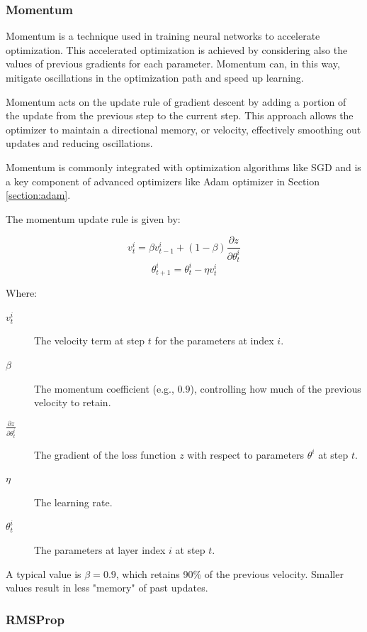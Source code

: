 		\bigskip
		\subsubsection{Momentum}
		\label{section:momentum}
		
		Momentum is a technique used in training neural networks to accelerate optimization. This accelerated optimization is achieved by considering also the values of previous gradients for each parameter. Momentum can, in this way, mitigate oscillations in the optimization path and speed up learning.
		
		Momentum acts on the update rule of gradient descent by adding a portion of the update from the previous step to the current step. This approach allows the optimizer to maintain a directional memory, or velocity, effectively smoothing out updates and reducing oscillations.
		
		Momentum is commonly integrated with optimization algorithms like SGD and is a key component of advanced optimizers like Adam optimizer in Section \ref{section:adam}.
		
		The momentum update rule is given by:
		
		$$
		v^i_t = \beta v^i_{t-1} + (1 - \beta)\frac{\partial z}{\partial \theta^i_{t}}
		$$
		$$
		\theta^i_{t+1} = \theta^i_t - \eta v^i_t
		$$
		
		Where:
		\begin{description}
			\item[$v^i_t$] The velocity term at step $t$ for the parameters at index $i$.
			\item[$\beta$] The momentum coefficient (e.g., $0.9$), controlling how much of the previous velocity to retain.
			\item[$\frac{\partial z}{\partial \theta^i_{t}}$] The gradient of the loss function $z$ with respect to parameters $\theta^i$ at step $t$.
			\item[$\eta$] The learning rate.
			\item[$\theta^i_t$] The parameters at layer index $i$ at step $t$.
		\end{description}
		\bigskip

		
		
		A typical value is $\beta = 0.9$, which retains 90\% of the previous velocity. Smaller values result in less "memory" of past updates.  


		\bigskip
		\subsubsection{RMSProp}
		\label{section:RMSProp}
		
